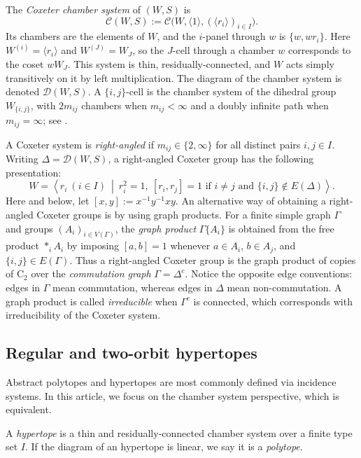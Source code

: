 \documentclass[11pt,letterpaper]{amsart}
\newcommand{\DD}{\mathcal{D}}
\newcommand{\CC}{\mathcal{C}}
\newcommand{\Cyc}{\mathrm{C}}
\begin{document}
The \emph{Coxeter chamber system} of $(W,S)$ is
\[
    \CC(W,S):=\CC\bigl(W,\langle 1\rangle,(\langle r_i\rangle)_{i\in I}\bigr).
\]
Its chambers are the elements of $W$, and the $i$-panel through $w$ is
$\{w,wr_i\}$.  Here $W^{(i)}=\langle r_i\rangle$ and $W^{(J)}=W_J$, so the
$J$-cell through a chamber $w$ corresponds to the coset $wW_J$.  This system is thin,
residually-connected, and $W$ acts simply transitively on it by left
multiplication.  The diagram of the chamber system is denoted $\DD(W,S)$. A $\{i,j\}$-cell is the chamber
system of the dihedral group $W_{\{i,j\}}$, with $2m_{ij}$ chambers when
$m_{ij}<\infty$ and a doubly infinite path when $m_{ij}=\infty$; see
\cite[Sections~4.1-4.2 and Corollary~4.5.16]{buekenhout2013diagram}.

A Coxeter system is \emph{right-angled} if $m_{ij}\in\{2,\infty\}$ for
all distinct pairs $i,j\in I$.  Writing $\Delta=\DD(W,S)$, a right-angled Coxeter group has the following presentation:
\[
    W=\left\langle r_i\ (i\in I)\ \middle|\
        r_i^2=1,\ [r_i,r_j]=1
        \text{ if }i\neq j\text{ and }\{i,j\}\notin E(\Delta)\right\rangle.
\]
Here and below, let $[x,y]:=x^{-1}y^{-1}xy$. An alternative way of obtaining a right-angled Coxeter groups is by using graph products.
For a finite simple graph $\Gamma$ and groups $(A_i)_{i\in V(\Gamma)}$, the
\emph{graph product} $\Gamma\{A_i\}$ is obtained from the free product
$\ast_i A_i$ by imposing $[a,b]=1$ whenever $a\in A_i$, $b\in A_j$, and
$\{i,j\}\in E(\Gamma)$. Thus a right-angled Coxeter group is the graph
product of copies of $\Cyc_2$ over the \emph{commutation graph}
$\Gamma=\Delta^c$.  Notice the opposite edge conventions: edges in
$\Gamma$ mean commutation, whereas edges in $\Delta$ mean non-commutation.
A graph product is called \emph{irreducible} when $\Gamma^c$ is connected,
which corresponds with irreducibility of the Coxeter system.


\subsection{Regular and two-orbit hypertopes}\label{sec:RegTwoOrbHyper}

Abstract polytopes and hypertopes are most commonly defined via incidence systems. In this article, we focus on the chamber system perspective, which is equivalent.

A \emph{hypertope} is a thin and residually-connected chamber system over a finite type set $I$. If the diagram of an hypertope is linear, we say it is a \emph{polytope}.
\end{document}

